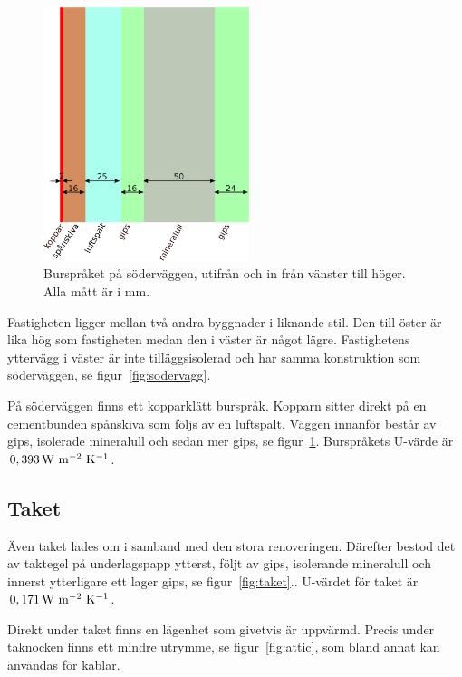 \begin{figure}[hpbt]
\centering
\includegraphics[width=6cm]{images/bursprak.eps}
\caption{\label{fig:bursprak}{Burspråket på söderväggen, utifrån och in från vänster till höger. Alla mått är i mm.}}
\end{figure}

Fastigheten ligger mellan två andra byggnader i liknande stil. Den till öster är lika hög som fastigheten medan den i väster är något lägre. Fastighetens yttervägg i väster är inte tilläggsisolerad och har samma konstruktion som söderväggen, se figur~\ref{fig:sodervagg}.

På söderväggen finns ett kopparklätt burspråk. Kopparn sitter direkt på en cementbunden spånskiva som följs av en luftspalt. Väggen innanför består av gips, isolerade mineralull och sedan mer gips, se figur~\ref{fig:bursprak}.\cite{kandidatarbete2010} Burspråkets U-värde är $\unit[0,393]{W~m^{-2}~K^{-1}}$.

\subsection{Taket}
Även taket lades om i samband med den stora renoveringen. Därefter bestod det av taktegel på underlagspapp ytterst, följt av gips, isolerande mineralull och innerst ytterligare ett lager gips, se figur~\ref{fig:taket}.\cite{kandidatarbete2010}. U-värdet för taket är $\unit[0,171]{W~m^{-2}~K^{-1}}$.

Direkt under taket finns en lägenhet som givetvis är uppvärmd. Precis under taknocken finns ett mindre utrymme, se figur~\ref{fig:attic}, som bland annat kan användas för kablar.

